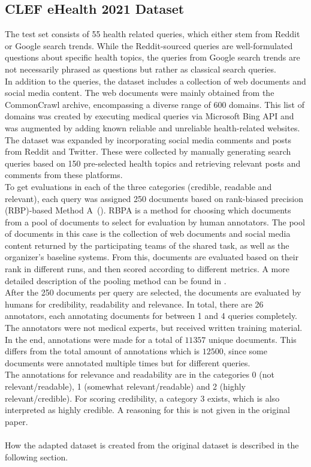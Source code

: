\subsection{CLEF eHealth 2021 Dataset}
The test set consists of 55 health related queries, which either stem from Reddit or Google search trends.
While the Reddit-sourced queries are well-formulated questions about specific health topics, the queries from Google search trends are not necessarily phrased as questions but rather as classical search queries.
\\
In addition to the queries, the dataset includes a collection of web documents and social media content.
The web documents were mainly obtained from the CommonCrawl archive, encompassing a diverse range of 600 domains.
This list of domains was created by executing medical queries via Microsoft Bing API and was augmented by adding known reliable and unreliable health-related websites.
The dataset was expanded by incorporating social media comments and posts from Reddit and Twitter.
These were collected by manually generating search queries based on 150 pre-selected health topics and retrieving relevant posts and comments from these platforms.
\\
To get evaluations in each of the three categories (credible, readable and relevant), each query was assigned 250 documents based on rank-biased precision (RBP)-based Method A~(\cite{moffat:2008}).
RBPA is a method for choosing which documents from a pool of documents to select for evaluation by human annotators.
The pool of documents in this case is the collection of web documents and social media content returned by the participating teams of the shared task, as well as the organizer's baseline systems.
From this, documents are evaluated based on their rank in different runs, and then scored according to different metrics.
A more detailed description of the pooling method can be found in \cite{lipani:2017}.
\\
After the 250 documents per query are selected, the documents are evaluated by humans for credibility, readability and relevance.
In total, there are 26 annotators, each annotating documents for between 1 and 4 queries completely.
The annotators were not medical experts, but received written training material.
In the end, annotations were made for  a total of $11 357$ unique documents.
This differs from the total amount of annotations which is $12 500$, since some documents were annotated multiple times but for different queries.
\\
The annotations for relevance and readability are in the categories 0 (not relevant/readable), 1 (somewhat relevant/readable) and 2 (highly relevant/credible).
For scoring credibility, a category 3 exists, which is also interpreted as highly credible.
A reasoning for this is not given in the original paper.
\\\\
How the adapted dataset is created from the original dataset is described in the following section.
